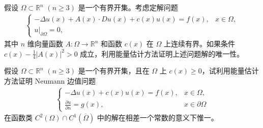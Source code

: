 \documentclass[../../main.tex]{subfiles}%
\begin{document}
\begin{example}
假设 $\Omega\subset\mathbb{R}^n$ $(n\geqslant 3)$ 是一个有界开集。考虑定解问题
\begin{align*}
\begin{cases}
-\Delta u(x) + A(x)\cdot Du(x) + c(x)u(x) = f(x), & x\in\Omega, \\
u|_{\partial\Omega} = 0,
\end{cases}
\end{align*}
其中 $n$ 维向量函数 $A:\Omega\to\mathbb{R}^n$ 和函数 $c(x)$ 在 $\Omega$ 上连续有界。如果条件 $c(x)-\frac{1}{4}|A(x)|^2>0$ 成立，利用能量估计方法证明上述问题解的唯一性。
\end{example}

\begin{example}
假设 $\Omega\subset\mathbb{R}^n$ $(n\geqslant 3)$ 是一个有界开集，且在 $\Omega$ 上 $c(x)\geqslant 0$，试利用能量估计方法证明 Neumann 边值问题
\begin{align*}
\begin{cases}
-\Delta u(x) + c(x)u(x) = f(x), & x\in\Omega, \\
\frac{\partial u}{\partial n} = g(x), & x\in\partial\Omega
\end{cases}
\end{align*}
在函数类 $C^2(\Omega)\cap C^1(\overline{\Omega})$ 中的解在相差一个常数的意义下惟一。
\end{example}
\end{document}

